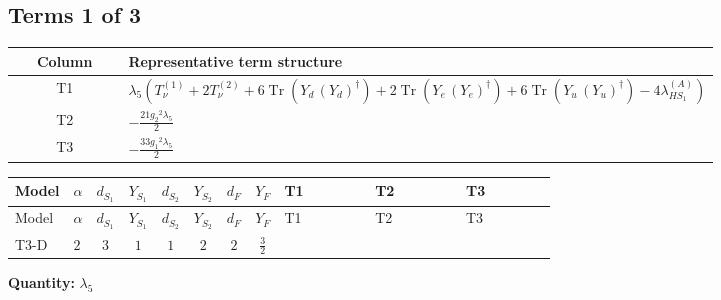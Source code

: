 \documentclass[8pt]{article}
\begin{document}
\begin{landscape}
\subsection*{Terms 1 of 3}
\begin{center}
\begin{tabular}{@{}c >{\raggedright\arraybackslash}p{0.82\linewidth}@{}}
\toprule
Column & Representative term structure \\
\midrule
T1 & \(\displaystyle {\lambda_5} (T_{\nu}^{(1)}+2 T_{\nu}^{(2)}+6 \operatorname{Tr}\!\left({Y_d}\,\left({Y_d}\right)^{\dagger}\right)+2 \operatorname{Tr}\!\left({Y_e}\,\left({Y_e}\right)^{\dagger}\right)+6 \operatorname{Tr}\!\left({Y_u}\,\left({Y_u}\right)^{\dagger}\right)-4 {\lambda_{HS_1}^{(A)}})\) \\
\midrule
T2 & \(\displaystyle -\frac{21 {g_2}^2 {\lambda_5}}{2}\) \\
\midrule
T3 & \(\displaystyle -\frac{33 {g_1}^2 {\lambda_5}}{2}\) \\
\midrule
\bottomrule
\end{tabular}
\end{center}
\smallskip
\tiny
\begin{longtable}{@{}llcccccc >{\raggedright\arraybackslash}p{0.21\linewidth} >{\raggedright\arraybackslash}p{0.21\linewidth} >{\raggedright\arraybackslash}p{0.21\linewidth}@{}}
\toprule
Model & $\alpha$ & $d_{S_1}$ & $Y_{S_1}$ & $d_{S_2}$ & $Y_{S_2}$ & $d_F$ & $Y_F$ & T1 & T2 & T3 \\
\midrule
\endfirsthead
\toprule
Model & $\alpha$ & $d_{S_1}$ & $Y_{S_1}$ & $d_{S_2}$ & $Y_{S_2}$ & $d_F$ & $Y_F$ & T1 & T2 & T3 \\
\midrule
\endhead
T3-D & $2$ & $3$ & $1$ & $1$ & $2$ & $2$ & $\frac{3}{2}$ & \scriptsize\adjustbox{max width=\linewidth}{$\begin{gathered} {\lambda_5} (T_{\nu}^{(1)}+2 T_{\nu}^{(2)}+6 \operatorname{Tr}\!\left({Y_d}\,\left({Y_d}\right)^{\dagger}\right)+2 \operatorname{Tr}\!\left({Y_e}\,\left({Y_e}\right)^{\dagger}\right)+6 \operatorname{Tr}\!\left({Y_u}\,\left({Y_u}\right)^{\dagger}\right)-4 {\lambda_{HS_1}^{(A)}})\end{gathered}$} & \scriptsize\adjustbox{max width=\linewidth}{$\begin{gathered} -\frac{21 {g_2}^2 {\lambda_5}}{2}\end{gathered}$} & \scriptsize\adjustbox{max width=\linewidth}{$\begin{gathered} -\frac{33 {g_1}^2 {\lambda_5}}{2}\end{gathered}$} \\
\midrule
\bottomrule
\end{longtable}
\clearpage
\noindent\textbf{Quantity: }$\lambda_5$\par\smallskip

\end{landscape}
\end{document}
